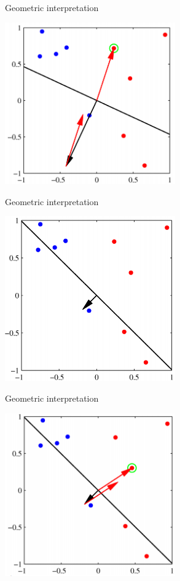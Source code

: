 \documentclass[notes]{beamer}
\begin{document}
\begin{frame}{Geometric interpretation}

\centering 

\includegraphics[width=0.55000\textwidth]{2018-03-08-22-45-53.png}\\

\end{frame}

\begin{frame}{Geometric interpretation}

\centering 

\includegraphics[width=0.55000\textwidth]{2018-03-08-22-46-08.png}\\

\end{frame}

\begin{frame}{Geometric interpretation}

\centering 

\includegraphics[width=0.55000\textwidth]{2018-03-08-22-46-39.png}\\

\end{frame}
\end{document}
